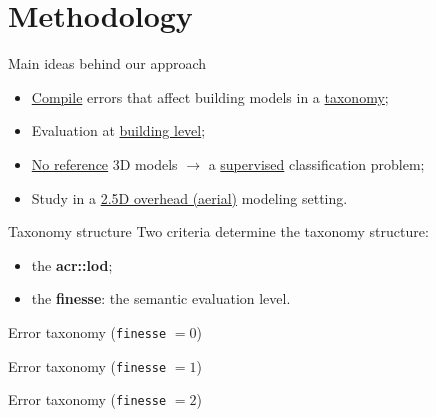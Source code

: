 \documentclass[10pt]{beamer}
\begin{document}
    \section{Methodology}
        \begin{frame}{Main ideas behind our approach}
            \begin{itemize}[label=$\blacktriangleright$, font=\color{IGNGreen}, itemsep=2em]
                \item<1-> \underline{Compile} errors that affect building models in a \underline{taxonomy};
                \item<2-> Evaluation at \underline{building level};
                \item<3-> \underline{No reference} 3D models $\longrightarrow$ a \underline{supervised} classification problem;
                \item<4-> Study in a \underline{2.5D overhead (aerial)} modeling setting.
            \end{itemize}
        \end{frame}
        \begin{frame}{Taxonomy structure}
            Two criteria determine the taxonomy structure:
            \begin{itemize}[label=$\blacktriangleright$, font=\color{IGNGreen}, itemsep=2em]
                \item<2-> the \textbf{\acrfull{acr::lod}};
                \item<3-> the \textbf{finesse}: the semantic evaluation level.
            \end{itemize}
        \end{frame}
        \begin{frame}{Error taxonomy (\texttt{finesse} $= 0$)}
            
        \end{frame}
        \begin{frame}{Error taxonomy (\texttt{finesse} $= 1$)}
            
        \end{frame}
        \begin{frame}{Error taxonomy (\texttt{finesse} $= 2$)}
            \only<1|handout:0>{
                
            }
        \end{frame}
\end{document}
